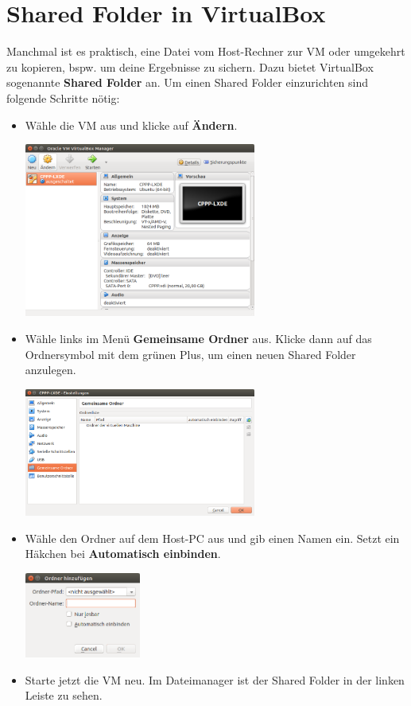 \section{\ExercisePrefixAdditionalInformation Shared Folder in VirtualBox}

Manchmal ist es praktisch, eine Datei vom Host-Rechner zur VM oder umgekehrt zu kopieren, bspw. um deine Ergebnisse zu sichern.
Dazu bietet VirtualBox sogenannte \textbf{Shared Folder} an.
Um einen Shared Folder einzurichten sind folgende Schritte nötig:

\begin{itemize}
\item Wähle die VM aus und klicke auf \textbf{Ändern}.
\begin{center}
	\includegraphics[width=0.6\textwidth]{07_cheatsheet/figures/sf1.png}
\end{center}
\item Wähle links im Menü \textbf{Gemeinsame Ordner} aus. Klicke dann auf das Ordnersymbol mit dem grünen Plus, um einen neuen Shared Folder anzulegen.
\begin{center}
	\includegraphics[width=0.6\textwidth]{07_cheatsheet/figures/sf2.png}
\end{center}
\item Wähle den Ordner auf dem Host-PC aus und gib einen Namen ein.
Setzt ein Häkchen bei \textbf{Automatisch einbinden}.
\begin{center}
	\includegraphics[width=0.3\textwidth]{07_cheatsheet/figures/sf3.png}
\end{center}
\item Starte jetzt die VM neu. Im Dateimanager ist der Shared Folder in der linken Leiste zu sehen.
\end{itemize}